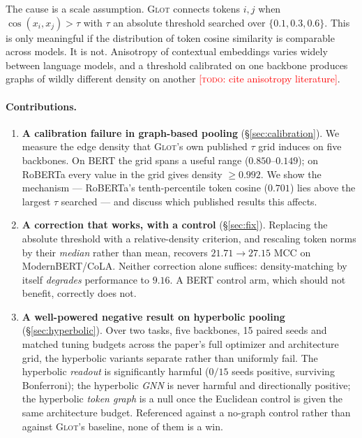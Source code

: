 \documentclass{article} %
\newcommand{\TODO}[1]{\textcolor{red}{[\textsc{todo}: #1]}}
\begin{document}
The cause is a scale assumption. \textsc{Glot} connects tokens $i,j$ when
$\cos(x_i, x_j) > \tau$ with $\tau$ an absolute threshold searched over
$\{0.1, 0.3, 0.6\}$. This is only meaningful if the distribution of token cosine
similarity is comparable across models. It is not. Anisotropy of contextual
embeddings varies widely between language models, and a threshold calibrated on
one backbone produces graphs of wildly different density on another
\TODO{cite anisotropy literature}.

\paragraph{Contributions.}
\begin{enumerate}
\item \textbf{A calibration failure in graph-based pooling}
      (\S\ref{sec:calibration}). We measure the edge density that
      \textsc{Glot}'s own published $\tau$ grid induces on five backbones. On
      BERT the grid spans a useful range ($0.850$--$0.149$); on RoBERTa every
      value in the grid gives density $\geq 0.992$. We show the mechanism ---
      RoBERTa's tenth-percentile token cosine ($0.701$) lies above the largest
      $\tau$ searched --- and discuss which published results this affects.
\item \textbf{A correction that works, with a control}
      (\S\ref{sec:fix}). Replacing the absolute threshold with a
      relative-density criterion, and rescaling token norms by their
      \emph{median} rather than mean, recovers $21.71 \rightarrow 27.15$ MCC on
      ModernBERT/CoLA. Neither correction alone suffices: density-matching by
      itself \emph{degrades} performance to $9.16$. A BERT control arm, which
      should not benefit, correctly does not.
\item \textbf{A well-powered negative result on hyperbolic pooling}
      (\S\ref{sec:hyperbolic}). Over two tasks, five backbones, 15 paired
      seeds and matched tuning budgets across the paper's full optimizer and
      architecture grid, the hyperbolic variants separate rather than
      uniformly fail. The hyperbolic \emph{readout} is significantly harmful
      ($0/15$ seeds positive, surviving Bonferroni); the hyperbolic \emph{GNN}
      is never harmful and directionally positive; the hyperbolic \emph{token
      graph} is a null once the Euclidean control is given the same
      architecture budget. Referenced against a no-graph control rather than
      against \textsc{Glot}'s baseline, none of them is a win.

\end{enumerate}
\end{document}
